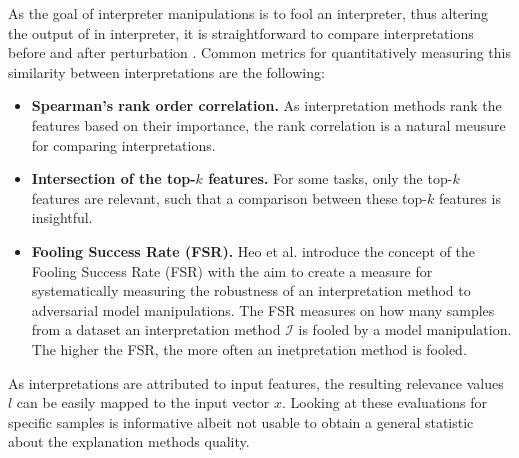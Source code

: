 As the goal of interpreter manipulations is to fool an interpreter, thus altering the output of in interpreter, it is straightforward to compare interpretations before and after perturbation \cite{ghorbani2019interpretation}.
Common metrics for quantitatively measuring this similarity between interpretations are the following: 
\begin{itemize}
    \item \textbf{Spearman's rank order correlation.} As interpretation methods rank the features based on their importance, the rank correlation \cite{spearman1961proof} is a natural meusure for comparing interpretations. 
    \item \textbf{Intersection of the top-$k$ features.} For some tasks, only the top-$k$ features are relevant, such that a comparison between these top-$k$ features is insightful. 
    \item \textbf{Fooling Success Rate (FSR).} Heo et al. \cite{fooling_nn_interpreters} introduce the concept of the Fooling Success Rate (FSR) with the aim to create a measure for systematically measuring the robustness of an interpretation method to adversarial model manipulations. The FSR measures on how many samples from a dataset an interpretation method $\mathcal{I}$ is fooled by a model manipulation. The higher the FSR, the more often an inetpretation method is fooled. 
\end{itemize}


As interpretations are attributed to input features, the resulting relevance values $l$ can be easily mapped to the input vector $x$.
Looking at these evaluations for specific samples is informative albeit not usable to obtain a general statistic about the explanation methods quality.
